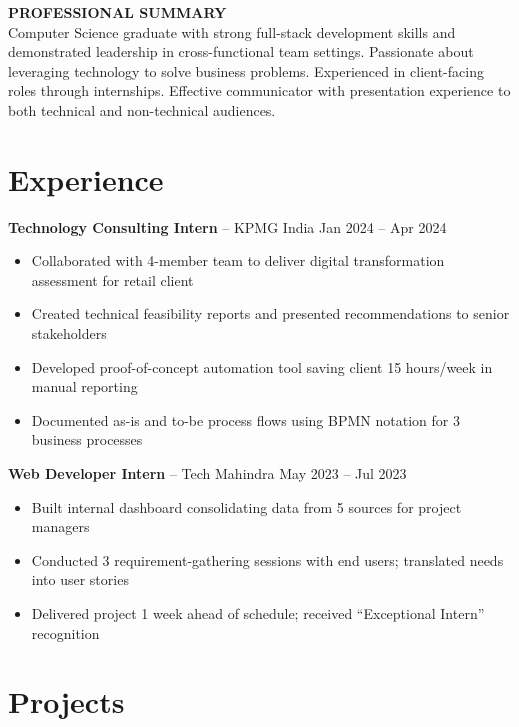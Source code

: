 \documentclass[10pt,a4paper]{article}
\begin{document}
\hfill
\begin{minipage}[t]{0.67\textwidth}
\vspace{0pt}

{\color{accent}\bfseries\footnotesize PROFESSIONAL SUMMARY}\\[2pt]
{\tiny Computer Science graduate with strong full-stack development skills and demonstrated leadership in cross-functional team settings. Passionate about leveraging technology to solve business problems. Experienced in client-facing roles through internships. Effective communicator with presentation experience to both technical and non-technical audiences.}

\vspace{4pt}
\section{Experience}

{\footnotesize\bfseries Technology Consulting Intern} -- KPMG India \hfill {\tiny Jan 2024 -- Apr 2024}
\begin{itemize}
    \item Collaborated with 4-member team to deliver digital transformation assessment for retail client
    \item Created technical feasibility reports and presented recommendations to senior stakeholders
    \item Developed proof-of-concept automation tool saving client 15 hours/week in manual reporting
    \item Documented as-is and to-be process flows using BPMN notation for 3 business processes
\end{itemize}

{\footnotesize\bfseries Web Developer Intern} -- Tech Mahindra \hfill {\tiny May 2023 -- Jul 2023}
\begin{itemize}
    \item Built internal dashboard consolidating data from 5 sources for project managers
    \item Conducted 3 requirement-gathering sessions with end users; translated needs into user stories
    \item Delivered project 1 week ahead of schedule; received ``Exceptional Intern'' recognition
\end{itemize}

\section{Projects}


\end{minipage}
\end{document}
